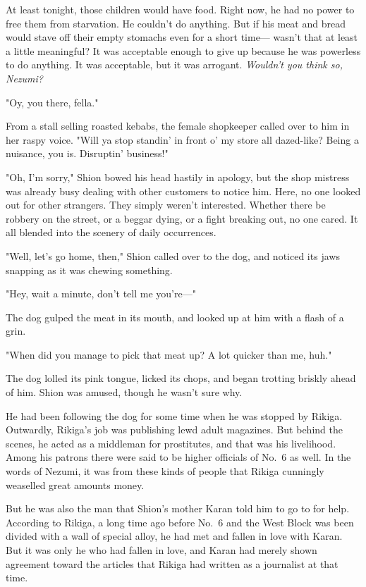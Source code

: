 At least tonight, those children would have food. Right now, he had no
power to free them from starvation. He couldn't do anything. But if his
meat and bread would stave off their empty stomachs even for a short
time--- wasn't that at least a little meaningful? It was acceptable enough
to give up because he was powerless to do anything. It was acceptable,
but it was arrogant. \emph{Wouldn't you think so, Nezumi?}

"Oy, you there, fella."

From a stall selling roasted kebabs, the female shopkeeper called over
to him in her raspy voice. "Will ya stop standin' in front o' my store
all dazed-like? Being a nuisance, you is. Disruptin' business!"

"Oh, I'm sorry," Shion bowed his head hastily in apology, but the shop
mistress was already busy dealing with other customers to notice him.
Here, no one looked out for other strangers. They simply weren't
interested. Whether there be robbery on the street, or a beggar dying,
or a fight breaking out, no one cared. It all blended into the scenery
of daily occurrences.

"Well, let's go home, then," Shion called over to the dog, and noticed
its jaws snapping as it was chewing something.

"Hey, wait a minute, don't tell me you're---"

The dog gulped the meat in its mouth, and looked up at him with a flash
of a grin.

"When did you manage to pick that meat up? A lot quicker than me, huh."

The dog lolled its pink tongue, licked its chops, and began trotting
briskly ahead of him. Shion was amused, though he wasn't sure why.

He had been following the dog for some time when he was stopped by
Rikiga. Outwardly, Rikiga's job was publishing lewd adult magazines. But
behind the scenes, he acted as a middleman for prostitutes, and that was
his livelihood. Among his patrons there were said to be higher officials
of No.~6 as well. In the words of Nezumi, it was from these kinds of
people that Rikiga cunningly weaselled great amounts money.

But he was also the man that Shion's mother Karan told him to go to for
help. According to Rikiga, a long time ago before No.~6 and the West
Block was been divided with a wall of special alloy, he had met and
fallen in love with Karan. But it was only he who had fallen in love,
and Karan had merely shown agreement toward the articles that Rikiga had
written as a journalist at that time.

